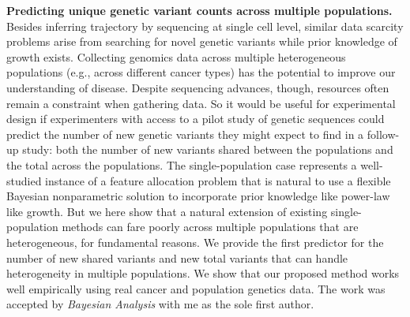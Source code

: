 

\textbf{Predicting unique genetic variant counts across multiple populations.}
Besides inferring trajectory by sequencing at single cell level, similar data scarcity problems arise from searching for novel genetic variants while prior knowledge of growth exists. Collecting genomics data across multiple heterogeneous populations (e.g., across different cancer types) has the potential to improve our understanding of disease. Despite sequencing advances, though, resources often remain a constraint when gathering data. So it would be useful for experimental design if experimenters with access to a pilot study of genetic sequences could predict the number of new genetic variants they might expect to find in a follow-up study: both the number of new variants shared between the populations and the total across the populations. The single-population case represents a well-studied instance of a feature allocation problem that is natural to use a flexible Bayesian nonparametric solution to incorporate prior knowledge like power-law like growth. But we here show that a natural extension of existing single-population methods can fare poorly across multiple populations that are heterogeneous, for fundamental reasons. We provide the first predictor for the number of new shared variants and new total variants that can handle heterogeneity in multiple populations. We show that our proposed method works well empirically using real cancer and population genetics data. The work \cite{shen2022double_trouble_journal} was accepted by \textit{Bayesian Analysis} with me as the sole first author. 

